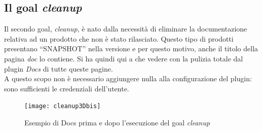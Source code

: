 \subsection{Il goal \emph{cleanup}}
Il secondo goal, \emph{cleanup}, è nato dalla necessità di eliminare la documentazione relativa ad un prodotto che non è stato rilasciato.
Questo tipo di prodotti presentano ``SNAPSHOT'' nella versione e per questo motivo, anche il titolo della pagina \emph{doc} lo contiene.
Si ha quindi qui a che vedere con la pulizia totale dal plugin \emph{Docs} di tutte queste pagine. \\
A questo scopo non è necessario aggiungere nulla alla configurazione del plugin: sono sufficienti le credenziali dell'utente. 

\begin{figure}[H]
	\centering
	\texttt{[image: cleanup3Dbis]}\\
	\caption{Esempio di Docs prima e dopo l'esecuzione del goal \emph{cleanup}}
	\label{cleanupBeforeAfter}
\end{figure}





